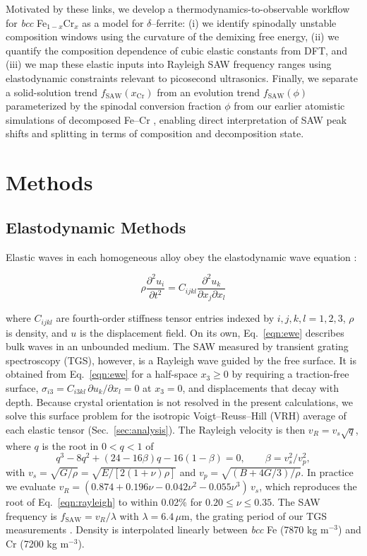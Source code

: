 \documentclass[final,3p,times]{elsarticle}
\begin{document}
Motivated by these links, we develop a thermodynamics-to-observable workflow for \textit{bcc} Fe$_{1-x}$Cr$_x$ as a model for $\delta$--ferrite: (i) we identify spinodally unstable composition windows using the curvature of the demixing free energy, (ii) we quantify the composition dependence of cubic elastic constants from DFT, and (iii) we map these elastic inputs into Rayleigh SAW frequency ranges using elastodynamic constraints relevant to picosecond ultrasonics. Finally, we separate a solid-solution trend $f_{\mathrm{SAW}}(x_{\mathrm{Cr}})$ from an evolution trend $f_{\mathrm{SAW}}(\phi)$ parameterized by the spinodal conversion fraction $\phi$ from our earlier atomistic simulations of decomposed Fe--Cr \cite{al2023detecting}, enabling direct interpretation of SAW peak shifts and splitting in terms of composition and decomposition state.


\section{Methods}

\subsection{Elastodynamic Methods}
Elastic waves in each homogeneous alloy obey the elastodynamic wave equation \cite{du2017facile}:

\begin{equation}
    \rho \frac{\partial^2 u_i}{\partial t^2} = C_{ijkl} \frac{\partial^2 u_k}{\partial x_j \partial x_l}
    \label{eqn:ewe}
\end{equation}

where $C_{ijkl}$ are fourth-order stiffness tensor entries indexed by $i,j,k,l=1,2,3$, $\rho$ is density, and $u$ is the displacement field. On its own, Eq.~\ref{eqn:ewe} describes bulk waves in an unbounded medium. The SAW measured by transient grating spectroscopy (TGS), however, is a Rayleigh wave guided by the free surface. It is obtained from Eq.~\ref{eqn:ewe} for a half-space $x_3 \geq 0$ by requiring a traction-free surface, $\sigma_{i3} = C_{i3kl}\,\partial u_k/\partial x_l = 0$ at $x_3=0$, and displacements that decay with depth. Because crystal orientation is not resolved in the present calculations, we solve this surface problem for the isotropic Voigt--Reuss--Hill (VRH) average of each elastic tensor (Sec.~\ref{sec:analysis}). The Rayleigh velocity is then $v_R = v_s\sqrt{q}$, where $q$ is the root in $0<q<1$ of
\begin{equation}
q^3 - 8q^2 + (24-16\beta)q - 16(1-\beta) = 0, \qquad \beta = v_s^2/v_p^2,
\label{eqn:rayleigh}
\end{equation}
with $v_s=\sqrt{G/\rho}=\sqrt{E/[2(1+\nu)\rho]}$ and $v_p=\sqrt{(B+4G/3)/\rho}$. In practice we evaluate $v_R=(0.874+0.196\nu-0.042\nu^2-0.055\nu^3)\,v_s$, which reproduces the root of Eq.~\ref{eqn:rayleigh} to within 0.02\% for $0.20\leq\nu\leq0.35$. The SAW frequency is $f_{\mathrm{SAW}} = v_R/\lambda$ with $\lambda = 6.4\,\mu$m, the grating period of our TGS measurements \cite{al2023detecting}. Density is interpolated linearly between \textit{bcc} Fe (7870 kg m$^{-3}$) and Cr (7200 kg m$^{-3}$).
\end{document}
